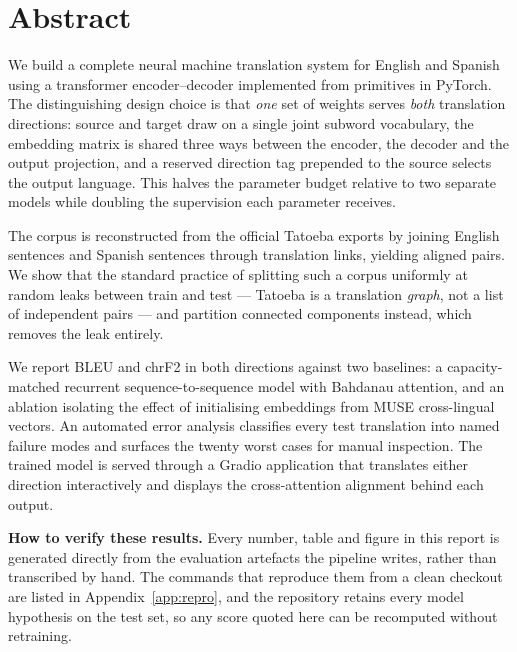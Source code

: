 \documentclass[11pt,a4paper]{article}
\begin{document}
\section*{Abstract}

We build a complete neural machine translation system for English and Spanish
using a transformer encoder--decoder implemented from primitives in PyTorch.
The distinguishing design choice is that \emph{one} set of weights serves
\emph{both} translation directions: source and target draw on a single joint
subword vocabulary, the embedding matrix is shared three ways between the
encoder, the decoder and the output projection, and a reserved direction tag
prepended to the source selects the output language. This halves the parameter
budget relative to two separate models while doubling the supervision each
parameter receives.

The corpus is reconstructed from the official Tatoeba exports by joining
\TatoebaEnglishSentences{} English sentences and \TatoebaSpanishSentences{}
Spanish sentences through \TatoebaLinksScanned{} translation links, yielding
\PairsRaw{} aligned pairs. We show that the standard practice of splitting such
a corpus uniformly at random leaks between train and test --- Tatoeba is a
translation \emph{graph}, not a list of independent pairs --- and partition
connected components instead, which removes the leak entirely.

We report BLEU and chrF2 in both directions against two baselines: a
capacity-matched recurrent sequence-to-sequence model with Bahdanau attention,
and an ablation isolating the effect of initialising embeddings from MUSE
cross-lingual vectors. An automated error analysis classifies every test
translation into named failure modes and surfaces the twenty worst cases for
manual inspection. The trained model is served through a Gradio application
that translates either direction interactively and displays the
cross-attention alignment behind each output.

\vspace{0.6em}
\begin{keypoint}
\textbf{How to verify these results.} Every number, table and figure in this
report is generated directly from the evaluation artefacts the pipeline writes,
rather than transcribed by hand. The commands that reproduce them from a clean
checkout are listed in Appendix~\ref{app:repro}, and the repository retains
every model hypothesis on the test set, so any score quoted here can be
recomputed without retraining.
\end{keypoint}
\end{document}
